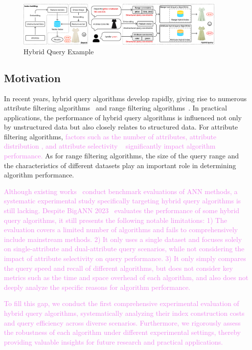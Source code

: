 \documentclass[sigconf, nonacm]{acmart}
\begin{document}
	\begin{figure}
		\centering
		\setlength{\belowcaptionskip}{-0.cm}
		\includegraphics[width=0.92\textwidth]{figures/hybrid ANNS.pdf}
		\caption{Hybrid Query Example}
		
		\label{fig:hybrid ANNS}
	\end{figure}
	\subsection{Motivation}
	In recent years, hybrid query algorithms develop rapidly, giving rise to numerous attribute filtering algorithms~\cite{NHQ,diskann} and range filtering algorithms~\cite{serf,iRangeGraph}. In practical applications, the performance of hybrid query algorithms is influenced not only by unstructured data but also closely relates to structured data. For attribute filtering algorithms, \textcolor{violet}{factors such as the number of attributes, attribute distribution \cite{UNG}, and attribute selectivity ~\cite{analyticdb,milvus} significantly impact algorithm performance.} As for range filtering algorithms, the size of the query range and the characteristics of different datasets play an important role in determining algorithm performance.
	
	\textcolor{violet}{Although existing works~\cite{compare,azizi2025graph} conduct benchmark evaluations of ANN methods, a systematic experimental study specifically targeting hybrid query algorithms is still lacking. Despite BigANN 2023~\cite{bigann2023} evaluates the performance of some hybrid query algorithms, it still presents the following notable limitations:
	1) The evaluation covers a limited number of algorithms and fails to comprehensively include mainstream methods.
	2) It only uses a single dataset and focuses solely on single-attribute and dual-attribute query scenarios, while not considering the impact of attribute selectivity on query performance.
	3) It only simply compares the query speed and recall of different algorithms, but does not consider key metrics such as the time and space overhead of each algorithm, and also does not deeply analyze the specific reasons for algorithm performance.}
	
	\textcolor{violet}{To fill this gap, we conduct the first comprehensive experimental evaluation of hybrid query algorithms, systematically analyzing their index construction costs and query efficiency across diverse scenarios. Furthermore, we rigorously assess the robustness of each algorithm under different experimental settings, thereby providing valuable insights for future research and practical applications.}
	
\end{document}
